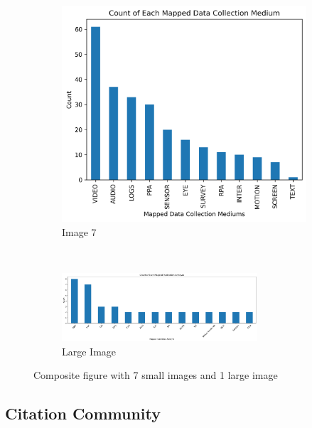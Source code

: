 \documentclass[manuscript,screen,review]{acmart}
\begin{document}
\begin{figure}[h!]
\begin{subfigure}[b]{0.33\textwidth}
        \includegraphics[width=\textwidth]{img/statistical_imgs/data_collection_mediums.png}
        \caption{Image 7}
    \end{subfigure}
    \\
    \begin{subfigure}[b]{\textwidth}
        \includegraphics[width=0.8\textwidth]{img/statistical_imgs/publications_w_o_others.png}
        \caption{Large Image}
    \end{subfigure}
    \caption{Composite figure with 7 small images and 1 large image}
\end{figure}


\subsection{Citation Community} %
\end{document}
